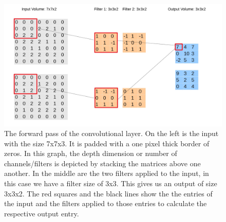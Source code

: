 \documentclass{article}
\begin{document}
\begin{figure}[H]
\begin{center}
\includegraphics[scale=0.25]{CNN_forward}
\end{center}
\caption{The forward pass of the convolutional layer. On the left is the input with the size 7x7x3. It is padded with a one pixel thick border of zeros. In this graph, the depth dimension or number of channels/filters is depicted by stacking the matrices above one another. In the middle are the two filters applied to the input, in this case we have a filter size of 3x3. This gives us an output of size 3x3x2. The red squares and the black lines show the the entries of the input and the filters applied to those entries to calculate the respective output entry. }
\label{fig:Convolution}
\end{figure}
\end{document}

